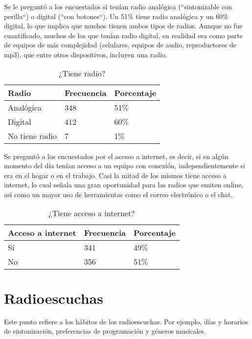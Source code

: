 \indent Se le preguntó a los encuestados si tenían radio analógica (``sintonizable con perilla``) o digital (``con botones``). Un 51$\%$ tiene radio analógica y un $60\%$ digital, lo que implica que muchos tienen ambos tipos de radios. Aunque no fue cuantificado, muchos de los que tenían radio digital, en realidad era como parte de equipos de más complejidad (celulares, equipos de audio, reproductores de mp3), que entre otros dispositivos, incluyen una radio.\\

\begin{table}[htpb]
	\centering
{}
		\begin{tabular}{|l|l|l|}\hline
	\textbf{Radio}&\textbf{Frecuencia}&\textbf{Porcentaje}\\\hline\hline
			Analógica	&	348&	51$\%$\\\hline
			Digital 	&	412&	60$\%$\\\hline
			No tiene radio 	&	7&	1$\%$\\\hline
		\end{tabular}
	  \caption{¿Tiene radio?}
	  \label{TieneRadioTabla}
\end{table}

\indent Se preguntó a los encuestados por el acceso a internet, es decir, si en algún momento del día tenían acceso a un equipo con conexión, independientemente si era en el hogar o en el trabajo. Casi la mitad de los mismos tiene acceso a internet, lo cual señala una gran oportunidad para las radios que emiten online, así como un mayor uso de herramientas como el correo electrónico o el chat.\\

\begin{table}[htpb]
	\centering
{}
		\begin{tabular}{|l|l|l|}\hline
	\textbf{Acceso a internet}&\textbf{Frecuencia}&\textbf{Porcentaje}\\\hline\hline
			Sí	&	341&	49$\%$\\\hline
			No 	&	356&	51$\%$\\\hline
		\end{tabular}
	  \caption{¿Tiene acceso a internet?}
	  \label{AccesoInternetTabla}
\end{table}


\section{Radioescuchas}
\indent Este punto refiere a los h\'abitos de los radioescuchas. Por ejemplo, d\'ias y horarios de sintonizaci\'on, preferencias de programaci\'on y g\'eneros musicales.\\

